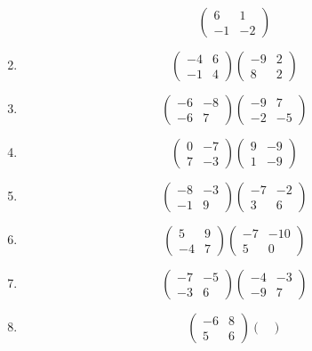 \documentclass{article}%
\begin{document}
\begin{enumerate}[label=\arabic*)]
\[\begin{pmatrix}
6&1\\%
-1&-2%
\end{pmatrix}%
\]%
\item%
\[%
\begin{pmatrix}%
-4&6\\%
-1&4%
\end{pmatrix} \begin{pmatrix}%
-9&2\\%
8&2%
\end{pmatrix}%
\]%
\item%
\[%
\begin{pmatrix}%
-6&-8\\%
-6&7%
\end{pmatrix} \begin{pmatrix}%
-9&7\\%
-2&-5%
\end{pmatrix}%
\]%
\item%
\[%
\begin{pmatrix}%
0&-7\\%
7&-3%
\end{pmatrix} \begin{pmatrix}%
9&-9\\%
1&-9%
\end{pmatrix}%
\]%
\item%
\[%
\begin{pmatrix}%
-8&-3\\%
-1&9%
\end{pmatrix} \begin{pmatrix}%
-7&-2\\%
3&6%
\end{pmatrix}%
\]%
\item%
\[%
\begin{pmatrix}%
5&9\\%
-4&7%
\end{pmatrix} \begin{pmatrix}%
-7&-10\\%
5&0%
\end{pmatrix}%
\]%
\item%
\[%
\begin{pmatrix}%
-7&-5\\%
-3&6%
\end{pmatrix} \begin{pmatrix}%
-4&-3\\%
-9&7%
\end{pmatrix}%
\]%
\item%
\[%
\begin{pmatrix}%
-6&8\\%
5&6%
\end{pmatrix} \begin{pmatrix}%

\end{pmatrix}\]
\end{enumerate}
\end{document}
